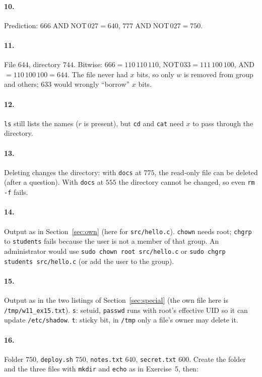 \documentclass[11pt,a4paper]{article}
\newcommand{\cmd}[1]{\texttt{#1}}
\begin{document}
\paragraph{10.} Prediction: $666 \mathbin{\text{AND}} \text{NOT}\,027 = 640$, $777 \mathbin{\text{AND}} \text{NOT}\,027 = 750$.


\paragraph{11.} File $644$, directory $744$. Bitwise: $666 = 110\,110\,110$, $\text{NOT}\,033 = 111\,100\,100$, AND $= 110\,100\,100 = 644$. The file never had $x$ bits, so only $w$ is removed from group and others; $633$ would wrongly ``borrow'' $x$ bits.


\paragraph{12.} \cmd{ls} still lists the names ($r$ is present), but \cmd{cd} and \cmd{cat} need $x$ to pass through the directory.


\paragraph{13.} Deleting changes the directory: with \texttt{docs} at $775$, the read-only file can be deleted (after a question). With \texttt{docs} at $555$ the directory cannot be changed, so even \cmd{rm -f} fails.


\paragraph{14.} Output as in Section~\ref{sec:own} (here for \texttt{src/hello.c}). \cmd{chown} needs root; \cmd{chgrp} to \texttt{students} fails because the user is not a member of that group. An administrator would use \cmd{sudo chown root src/hello.c} or \cmd{sudo chgrp students src/hello.c} (or add the user to the group).

\paragraph{15.} Output as in the two listings of Section~\ref{sec:special} (the own file here is \texttt{/tmp/w11\_ex15.txt}). \texttt{s}: setuid, \cmd{passwd} runs with root's effective UID so it can update \texttt{/etc/shadow}. \texttt{t}: sticky bit, in \texttt{/tmp} only a file's owner may delete it.

\paragraph{16.} Folder $750$, \texttt{deploy.sh} $750$, \texttt{notes.txt} $640$, \texttt{secret.txt} $600$. Create the folder and the three files with \cmd{mkdir} and \cmd{echo} as in Exercise~5, then:

\end{document}

